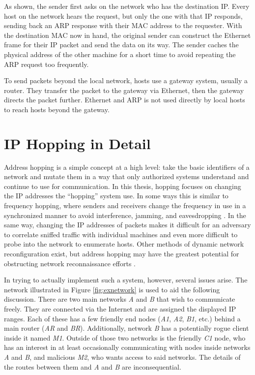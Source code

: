 \par As shown, the sender first asks on the network who has the destination \ac{IP}. Every host on the network hears the request, but only the one with that \ac{IP} responds, sending back an \ac{ARP} response with their \ac{MAC} address to the requester. With the destination \ac{MAC} now in hand, the original sender can construct the Ethernet frame for their \ac{IP} packet and send the data on its way. The sender caches the physical address of the other machine for a short time to avoid repeating the \ac{ARP} request too frequently.

\par To send packets beyond the local network, hosts use a gateway system, usually a router. They transfer the packet to the gateway via Ethernet, then the gateway directs the packet further. Ethernet and \ac{ARP} is not used directly by local hosts to reach hosts beyond the gateway.

\section{IP Hopping in Detail}
\label{sec:hopping}
\par Address hopping is a simple concept at a high level: take the basic identifiers of a network and mutate them in a way that only authorized systems understand and continue to use for communication. In this thesis, hopping focuses on changing the \ac{IP} addresses the ``hopping'' system use. In some ways this is similar to frequency hopping, where senders and receivers change the frequency in use in a synchronized manner to avoid interference, jamming, and eavesdropping \cite{FreqHop}. In the same way, changing the \ac{IP} addresses of packets makes it difficult for an adversary to correlate sniffed traffic with individual machines and even more difficult to probe into the network to enumerate hosts. Other methods of dynamic network reconfiguration exist, but address hopping may have the greatest potential for obstructing network reconnaissance efforts \cite{DefeatingAdversaryNIE}.

\par In trying to actually implement such a system, however, several issues arise.  The network illustrated in Figure \ref{fig:exnetwork} is used to aid the following discussion. There are two main networks \textit{A} and \textit{B} that wish to communicate freely. They are connected via the Internet and are assigned the displayed IP ranges. Each of these has a few friendly end nodes (\textit{A1}, \textit{A2}, \textit{B1}, etc.) behind a main router (\textit{AR} and \textit{BR}). Additionally, network \textit{B} has a potentially rogue client inside it named \textit{M1}. Outside of those two networks is the friendly \textit{C1} node, who has an interest in at least occasionally communicating with nodes inside networks \textit{A} and \textit{B}, and malicious \textit{M2}, who wants access to said networks. The details of the routes between them and \textit{A} and \textit{B} are inconsequential.

